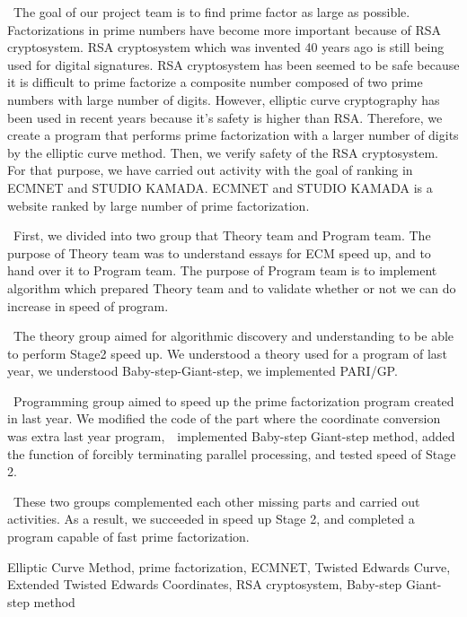 \documentclass[openany,11pt,papersize]{jsbook}
\begin{document}
\begin{eabstract}

~The goal of our project team is to find prime factor as large as possible. Factorizations in prime numbers have become more important because of RSA cryptosystem. RSA cryptosystem which was invented 40 years ago is still being used for digital signatures. RSA cryptosystem has been seemed to be safe because it is difficult to prime factorize a composite number composed of two prime numbers with large number of digits. However, elliptic curve cryptography has been used in recent years because it's safety is higher than RSA. Therefore, we create a program that performs prime factorization with a larger number of digits by the elliptic curve method. Then, we verify safety of the RSA cryptosystem. For that purpose, we have carried out activity with the goal of ranking in ECMNET\cite{EN2017} and STUDIO KAMADA\cite{SK2017}. ECMNET and STUDIO KAMADA is a website ranked by large number of prime factorization.

~First, we divided into two group that Theory team and Program team. The purpose of Theory team was to understand essays for ECM speed up, and to hand over it to Program team.
The purpose of Program team is to implement algorithm which prepared Theory team and to validate whether or not we can do increase in speed of program.

~The theory group aimed for algorithmic discovery and understanding to be able to perform Stage2 speed up. We understood a theory used for a program of last year, we understood Baby-step-Giant-step, we implemented PARI/GP.

~Programming group aimed to speed up the prime factorization program created in last year. We modified the code of the part where the coordinate conversion was extra last year program,　implemented Baby-step Giant-step method, added the function of forcibly terminating parallel processing, and tested speed of Stage 2.

~These two groups complemented each other missing parts and carried out activities. As a result, we succeeded in speed up Stage 2, and completed a program capable of fast prime factorization.

\begin{ekeyword}
Elliptic Curve Method, prime factorization, ECMNET, Twisted Edwards Curve, Extended Twisted Edwards Coordinates, RSA cryptosystem, Baby-step Giant-step method
\end{ekeyword}
\end{eabstract}
\end{document}
